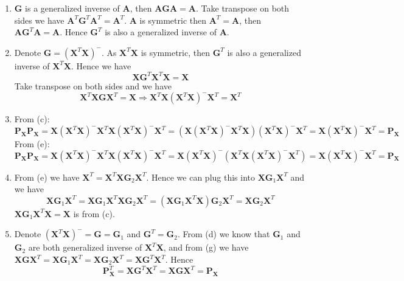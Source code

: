 \documentclass{article}
\begin{document}
\begin{enumerate}[leftmargin = 0 em, label = \arabic*., font = \bfseries]
\begin{enumerate}
	\item 
	$\bm G$ is a generalized inverse of $\bm A$, then $\bm A \bm G \bm A = \bm A$. Take transpose on both sides we have $\bm A^T \bm G^T \bm A^T = \bm A^T$. $\bm A$ is symmetric then $\bm A^T = \bm A$, then $\bm A \bm G^T \bm A = \bm A$. Hence $\bm G^T$ is also a generalized inverse of $\bm A$.

	\item 
	Denote $\bm G = (\bm X^T \bm X)^{-}$. As $\bm X^T \bm X$ is symmetric, then $\bm G^T$ is also a generalized inverse of $\bm X^T \bm X$. Hence we have 
	\[\bm X \bm G^T \bm X^T \bm X = \bm X\]
	Take transpose on both sides and we have 
	\[\bm X^T \bm X \bm G \bm X^T = \bm X \Rightarrow \bm X^T \bm X (\bm X^T \bm X)^{-} \bm X^T = \bm X^T\]

	\item 
	From (c):
	\[\bm P_{\bm X} \bm P_{\bm X} = \bm X(\bm X^T \bm X)^- \bm X^T \bm X (\bm X^T \bm X)^- \bm X^T = (\bm X(\bm X^T \bm X)^- \bm X^T \bm X) (\bm X^T \bm X)^- \bm X^T = \bm X (\bm X^T \bm X)^- \bm X^T = \bm P_{\bm X} \]
	From (e):
	\[\bm P_{\bm X} \bm P_{\bm X} = \bm X(\bm X^T \bm X)^- \bm X^T \bm X (\bm X^T \bm X)^- \bm X^T = \bm X(\bm X^T \bm X)^- (\bm X^T \bm X (\bm X^T \bm X)^- \bm X^T) = \bm X (\bm X^T \bm X)^- \bm X^T = \bm P_{\bm X} \]

\item 
From (e) we have $\bm X^T = \bm X^T \bm X \bm G_2 \bm X^T$. Hence we can plug this into $\bm X \bm G_1 \bm X^T$ and we have 
\[\bm X \bm G_1 \bm X^T = \bm X \bm G_1 \bm X^T \bm X \bm G_2 \bm X^T = (\bm X \bm G_1 \bm X^T \bm X) \bm G_2 \bm X^T = \bm X \bm G_2 \bm X^T\]
$\bm X \bm G_1 \bm X^T \bm X = \bm X$ is from (c).


\item 
Denote $(\bm X^T \bm X)^- = \bm G = \bm G_1$ and $\bm G^T = \bm G_2$. From (d) we know that $\bm G_1 $ and $\bm G_2$ are both generalized inverse of $\bm X^T \bm X$, and from (g) we have $\bm X \bm G \bm X^T  =\bm X \bm G_1 \bm X^T = \bm X \bm G_2 \bm X^T = \bm X \bm G^T \bm X^T. $ Hence
\[\bm P_{\bm X}^T = \bm X \bm G^T \bm X^T = \bm X \bm G \bm X^T = \bm P_{\bm X}\]
\end{enumerate}








 	\end{enumerate}


	
	
	
	
\end{document}
